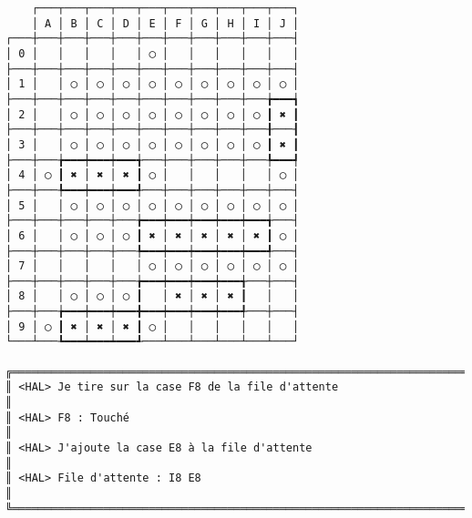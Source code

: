 {\scriptsize
\begin{verbatim}
    ┌───┬───┬───┬───┬───┬───┬───┬───┬───┬───┐
    │ A │ B │ C │ D │ E │ F │ G │ H │ I │ J │
┌───┼───┼───┼───┼───┼───┼───┼───┼───┼───┼───┤
│ 0 │   │   │   │   │ ◯ │   │   │   │   │   │
├───┼───┼───┼───┼───┼───┼───┼───┼───┼───┼───┤
│ 1 │   │ ◯ │ ◯ │ ◯ │ ◯ │ ◯ │ ◯ │ ◯ │ ◯ │ ◯ │
├───┼───┼───┼───┼───┼───┼───┼───┼───┼───╆━━━┪
│ 2 │   │ ◯ │ ◯ │ ◯ │ ◯ │ ◯ │ ◯ │ ◯ │ ◯ ┃ ✖ ┃
├───┼───┼───┼───┼───┼───┼───┼───┼───┼───╂───┨
│ 3 │   │ ◯ │ ◯ │ ◯ │ ◯ │ ◯ │ ◯ │ ◯ │ ◯ ┃ ✖ ┃
├───┼───╆━━━┿━━━┿━━━╅───┼───┼───┼───┼───╄━━━┩
│ 4 │ ◯ ┃ ✖ │ ✖ │ ✖ ┃ ◯ │   │   │   │   │ ◯ │
├───┼───╄━━━┿━━━┿━━━╃───┼───┼───┼───┼───┼───┤
│ 5 │   │ ◯ │ ◯ │ ◯ │ ◯ │ ◯ │ ◯ │ ◯ │ ◯ │ ◯ │
├───┼───┼───┼───┼───╆━━━┿━━━┿━━━┿━━━┿━━━╅───┤
│ 6 │   │ ◯ │ ◯ │ ◯ ┃ ✖ │ ✖ │ ✖ │ ✖ │ ✖ ┃ ◯ │
├───┼───┼───┼───┼───╄━━━┿━━━┿━━━┿━━━┿━━━╃───┤
│ 7 │   │   │   │   │ ◯ │ ◯ │ ◯ │ ◯ │ ◯ │ ◯ │
├───┼───┼───┼───┼───╆━━━┿━━━┿━━━┿━━━╅───┼───┤
│ 8 │   │ ◯ │ ◯ │ ◯ ┃   │ ✖ │ ✖ │ ✖ ┃   │   │
├───┼───╆━━━┿━━━┿━━━╋━━━┿━━━┿━━━┿━━━╃───┼───┤
│ 9 │ ◯ ┃ ✖ │ ✖ │ ✖ ┃ ◯ │   │   │   │   │   │
└───┴───┺━━━┷━━━┷━━━┹───┴───┴───┴───┴───┴───┘

╔══════════════════════════════════════════════════════════════════════════════════════════════════╗
║ <HAL> Je tire sur la case F8 de la file d'attente                                                ║
║ <HAL> F8 : Touché                                                                                ║
║ <HAL> J'ajoute la case E8 à la file d'attente                                                    ║
║ <HAL> File d'attente : I8 E8                                                                     ║
╚══════════════════════════════════════════════════════════════════════════════════════════════════╝
\end{verbatim}}
\newpage

